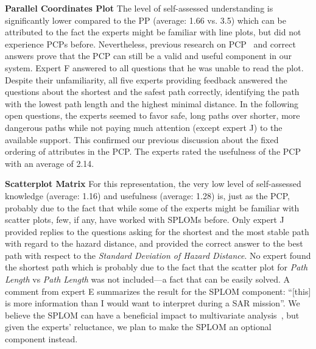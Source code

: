 \documentclass[conference,10pt,letter]{IEEEtran}
\begin{document}
\noindent \textbf{Parallel Coordinates Plot} The level of self-assessed understanding is significantly lower compared to the PP (average: 1.66 vs. 3.5) which can be attributed to the fact the experts might be familiar with line plots, but did not experience PCPs before. Nevertheless, previous research on PCP~\cite{CGF:CGF1666} and correct answers prove that the PCP can still be a valid and useful component in our system. Expert F answered to all questions that he was unable to read the plot. Despite their unfamiliarity, all five experts providing feedback answered the questions about the shortest and the safest path correctly, identifying the path with the lowest path length and the highest minimal distance. In the following open questions, the experts seemed to favor safe, long paths over shorter, more dangerous paths while not paying much attention (except expert J) to the available support. This confirmed our previous discussion about the fixed ordering of attributes in the PCP. The experts rated the usefulness of the PCP with an average of 2.14. 

\noindent \textbf{Scatterplot Matrix} For this representation, the very low level of self-assessed knowledge (average: 1.16) and usefulness (average: 1.28) is, just as the PCP, probably due to the fact that while some of the experts might be familiar with scatter plots, few, if any, have worked with SPLOMs before. Only expert J provided replies to the questions asking for the shortest and the most stable path with regard to the hazard distance, and provided the correct answer to the best path with respect to the \emph{Standard Deviation of Hazard Distance}. No expert found the shortest path which is probably due to the fact that the scatter plot for \emph{Path Length} vs \emph{Path Length} was not included---a fact that can be easily solved. A comment from expert E summarizes the result for the SPLOM component: ``[this] is more information than I would want to interpret during a SAR mission''. We believe the SPLOM can have a beneficial impact to multivariate analysis~\cite{6064985}, but given the experts' reluctance, we plan to make the SPLOM an optional component instead.
\end{document}
